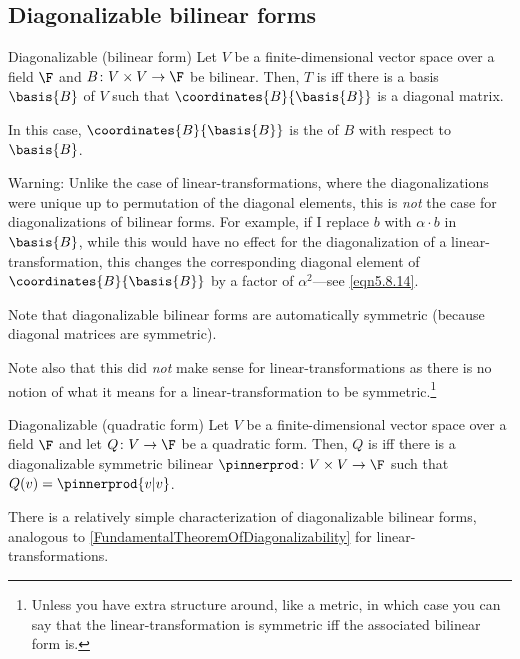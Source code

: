 \subsection{Diagonalizable bilinear forms}

\begin{dfn}{Diagonalizable (bilinear form)}{}
	Let $V$ be a finite-dimensional vector space over a field $\F$ and $B\colon V\times V\rightarrow \F$ be bilinear.  Then, $T$ is  iff there is a basis $\basis{B}$ of $V$ such that $\coordinates{B}{\basis{B}}$ is a diagonal matrix.
	\begin{rmk}
		In this case, $\coordinates{B}{\basis{B}}$ is the  of $B$ with respect to $\basis{B}$.
	\end{rmk}
	\begin{rmk}
		Warning:  Unlike the case of linear-transformations, where the diagonalizations were unique up to permutation of the diagonal elements, this is \emph{not} the case for diagonalizations of bilinear forms.  For example, if I replace $b$ with $\alpha \cdot b$ in $\basis{B}$, while this would have no effect for the diagonalization of a linear-transformation, this changes the corresponding diagonal element of $\coordinates{B}{\basis{B}}$ by a factor of $\alpha ^2$---see \eqref{eqn5.8.14}.
	\end{rmk}
	\begin{rmk}
		Note that diagonalizable bilinear forms are automatically symmetric (because diagonal matrices are symmetric).
		
		Note also that this did \emph{not} make sense for linear-transformations as there is no notion of what it means for a linear-transformation to be symmetric.\footnote{Unless you have extra structure around, like a metric, in which case you can say that the linear-transformation is symmetric iff the associated bilinear form is.}
	\end{rmk}
\end{dfn}
\begin{dfn}{Diagonalizable (quadratic form)}{}
	Let $V$ be a finite-dimensional vector space over a field $\F$ and let $Q\colon V\rightarrow \F$ be a quadratic form.  Then, $Q$ is  iff there is a diagonalizable symmetric bilinear $\pinnerprod \colon V\times V\rightarrow \F$ such that $Q(v)=\pinnerprod{v|v}$.
\end{dfn}
There is a relatively simple characterization of diagonalizable bilinear forms, analogous to \cref{FundamentalTheoremOfDiagonalizability} for linear-transformations.
